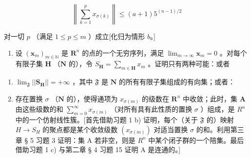 \[
\left\| \sum_ {k = 1} ^ {p} x _ {\sigma (k)} \right\| \leqslant (a + 1) 5 ^ {(n - 1) / 2}
\]

对一切 \(p\) （满足 \(1 \leqslant p \leqslant m\) ）成立{[}化归为情形 \(b\)。{]}

\begin{enumerate}
\def\labelenumi{\arabic{enumi})}
\setcounter{enumi}{1}
\tightlist
\item
  设 \((\pmb{x}_m)_{m\in \mathbb{N}}\) 是 \(\mathbf{R}^n\) 的点的一个无穷序列，满足 \(\lim_{m\to \infty}\pmb{x}_m = 0\) 。对每个有限子集 \(\mathbf{H}\) （\(\mathbf{N}\) 的），令 \(S_{\mathbf{H}} = \sum_{m\in \mathbf{H}}x_m\) 。证明只有两种可能：或者
\end{enumerate}

\begin{enumerate}
\def\labelenumi{(\roman{enumi})}
\item
  \(\lim_{\mathfrak{F}}||\mathbf{S}_{\mathbf{H}}|| = +\infty\) ，其中 \(\mathfrak{F}\) 是 \(\mathbf{N}\) 的所有有限子集组成的有向集；或者：
\item
  存在置换 \(\sigma\) （\(\mathbf{N}\) 的），使得通项为 \(x_{\sigma(m)}\) 的级数在 \(\mathbf{R}^n\) 中收敛；此时，集 \(\mathbf{A}\) 由这些级数的和 \(\sum_{m=0}^{\infty} x_{\sigma(m)}\) （对所有具有此性质的置换 \(\sigma\) ）组成，是 \(R^n\) 中的一个仿射线性簇。{[}首先借助习题 1 b) 证明，每个（关于 \(\mathfrak{F}\) 的）映射 \(H \to S_H\) 的聚点都是某个收敛级数 \((x_{\sigma(m)})\) 对适当置换 \(\sigma\) 的和。利用第三章 § 5 习题 3 证明：集 A 若非空，则是 \(R^n\) 中某个闭子群的一个陪集。最后借助习题 1 c) 与第二章 § 4 习题 15 证明 A 是连通的。{]}
\end{enumerate}

